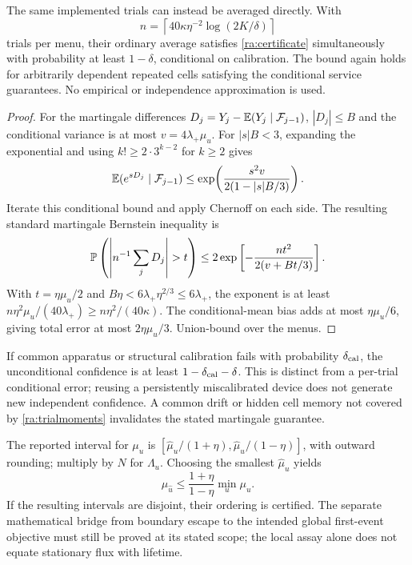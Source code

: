 \begin{theorem}
The same implemented trials can instead be averaged directly. With
\begin{equation}
 n=\left\lceil40\kappa\eta^{-2}\log(2K/\delta)\right\rceil
 \label{ra:bernsteinN}
\end{equation}
trials per menu, their ordinary average satisfies
\eqref{ra:certificate} simultaneously with probability at least
$1-\delta$, conditional on calibration. The bound again holds for
arbitrarily dependent repeated cells satisfying the conditional service
guarantees. No empirical or independence approximation is used.
\end{theorem}
\begin{proof}
For the martingale differences $D_j=Y_j-\mathbb E(Y_j\mid\mathcal F_{j-1})$,
$|D_j|\le B$ and the conditional variance is at most
$v=4\lambda_+\mu_u$. For $|s|B<3$, expanding the exponential and using
$k!\ge2\cdot3^{k-2}$ for $k\ge2$ gives
\[
 \mathbb E(e^{sD_j}\mid\mathcal F_{j-1})
 \le\exp\!\left(\frac{s^2v}{2(1-|s|B/3)}\right).
\]
Iterate this conditional bound and apply Chernoff on each side. The
resulting standard martingale Bernstein inequality is
\[
 \RAP\left(\left|n^{-1}\sum_jD_j\right|>t\right)
 \le2\exp\left[-\frac{nt^2}{2(v+Bt/3)}\right].
\]
With $t=\eta\mu_u/2$ and
$B\eta<6\lambda_+\eta^{2/3}\le6\lambda_+$, the exponent is at least
$n\eta^2\mu_u/(40\lambda_+)\ge n\eta^2/(40\kappa)$.
The conditional-mean bias adds at most $\eta\mu_u/6$, giving total
error at most $2\eta\mu_u/3$. Union-bound over the menus.
\end{proof}

If common apparatus or structural calibration fails with probability
$\delta_{\rm cal}$, the unconditional confidence is at least
$1-\delta_{\rm cal}-\delta$. This is distinct from a per-trial conditional
error; reusing a persistently miscalibrated device does not generate new
independent confidence. A common drift or hidden cell memory not covered
by \eqref{ra:trialmoments} invalidates the stated martingale guarantee.

The reported interval for $\mu_u$ is
$[\widehat\mu_u/(1+\eta),\widehat\mu_u/(1-\eta)]$, with outward
rounding; multiply by $N$ for $\Lambda_u$. Choosing the smallest
$\widehat\mu_u$ yields
\[
 \mu_{\widehat u}\le\frac{1+\eta}{1-\eta}\min_u\mu_u.
\]
If the resulting intervals are disjoint, their ordering is certified.
The separate mathematical bridge from boundary escape to the intended
global first-event objective must still be proved at its stated scope;
the local assay alone does not equate stationary flux with lifetime.

